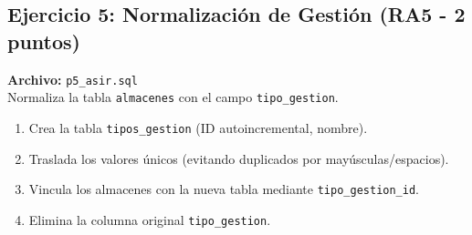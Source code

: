 \documentclass[12pt,a4paper]{article}
\begin{document}
\subsection{Ejercicio 5: Normalización de Gestión \textcolor{RA5}{(RA5 - 2 puntos)}}
\textbf{Archivo:} \texttt{p5\_asir.sql} \\
Normaliza la tabla \texttt{almacenes} con el campo \texttt{tipo\_gestion}.
\begin{enumerate}
    \item Crea la tabla \texttt{tipos\_gestion} (ID autoincremental, nombre).
    \item Traslada los valores únicos (evitando duplicados por mayúsculas/espacios).
    \item Vincula los almacenes con la nueva tabla mediante \texttt{tipo\_gestion\_id}.
    \item Elimina la columna original \texttt{tipo\_gestion}.
\end{enumerate}
\end{document}
